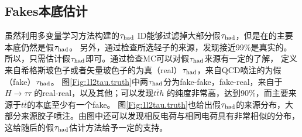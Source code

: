 \subsection{Fakes本底估计}
虽然利用多变量学习方法构建的$\tau_{\text{had}}$ ID能够过滤掉大部分假$\tau_{\text{had}}$，但是在\ltwotau 的主要本底仍然是假$\tau_{\text{had}}$。
另外，通过检查所选轻子的来源，发现接近99\%是真实的。所以，只需估计假$\tau_{\text{had}}$即可。通过检查MC可以对假$\tau_{\text{had}}$来源有一定的了解，
定义来自希格斯玻色子或者矢量玻色子的为真（real）$\tau_{\text{had}}$，来自QCD喷注的为假（fake）$\tau_{\text{had}}$。
图\ref{Fig:1l2tau.truth}中两$\tau_{\text{had}}$分为fake-fake，fake-real，来自于$H\rightarrow \tau\tau$
的real-real，以及其他；可以发现$t \bar{t}h$ 的纯度非常高，达到90\%，而主要来源于$t\bar{t}$的本底至少有一个fake。
图\ref{Fig:1l2tau.truth}也给出假$\tau_{\text{had}}$的来源分布，大部分来源胶子喷注。由图中还可以发现相反电荷与相同电荷具有非常相似的分布，
这给随后的假$\tau_{\text{had}}$估计方法给予一定的支持。

